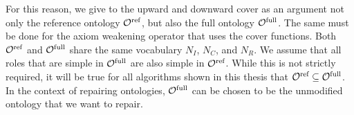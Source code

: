 For this reason, we give to the upward and downward cover as an argument not only the reference ontology ${\mathcal{O}^\textnormal{ref}}$, but also the full ontology ${\mathcal{O}^\textnormal{full}}$. The same must be done for the axiom weakening operator that uses the cover functions. Both ${\mathcal{O}^\textnormal{ref}}$ and ${\mathcal{O}^\textnormal{full}}$ share the same vocabulary $N_I$, $N_C$, and $N_R$. We assume that all roles that are simple in ${\mathcal{O}^\textnormal{full}}$ are also simple in ${\mathcal{O}^\textnormal{ref}}$. While this is not strictly required, it will be true for all algorithms shown in this thesis that ${\mathcal{O}^\textnormal{ref}} \subseteq {\mathcal{O}^\textnormal{full}}$. In the context of repairing ontologies, ${\mathcal{O}^\textnormal{full}}$ can be chosen to be the unmodified ontology that we want to repair.


